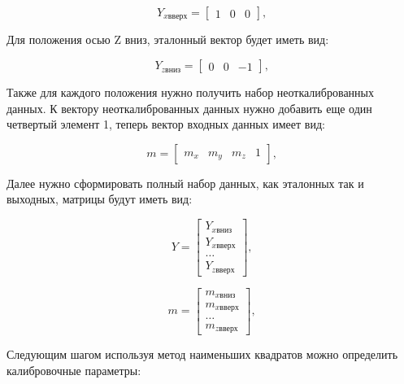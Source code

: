 \begin{equation}
    \label{eq:domain:Yxup}
    Y_{xвверх} = \begin{bmatrix}
            1 & 0 & 0
        \end{bmatrix}
        \text{,}
  \end{equation}

Для положения осью Z вниз, эталонный вектор будет иметь вид:

\begin{equation}
    \label{eq:domain:Yzdown}
    Y_{zвниз} = \begin{bmatrix}
            0 & 0 & -1
        \end{bmatrix}
        \text{,}
  \end{equation}

Также для каждого положения нужно получить набор неоткалиброванных данных. 
К вектору неоткалиброванных данных нужно добавить еще один четвертый элемент 1, теперь вектор входных данных имеет вид:

\begin{equation}
    \label{eq:domain:XL_meas}
    m = \begin{bmatrix}
            m_{x} & m_{y} & m_{z} & 1
        \end{bmatrix}
        \text{,}
  \end{equation}

Далее нужно сформировать полный набор данных, как эталонных так и выходных, матрицы будут иметь вид:

\begin{equation}
    \label{eq:domain:XL_Y_dataset}
    Y = \begin{bmatrix}
            Y_{xвниз} \\ Y_{xвверх} \\ \dots \\ Y_{zвверх}
        \end{bmatrix}
        \text{,}
  \end{equation}


\begin{equation}
    \label{eq:domain:XL_M_dataset}
    m = \begin{bmatrix}
            m_{xвниз} \\ m_{xвверх} \\ \dots \\ m_{zвверх}
        \end{bmatrix}
        \text{,}
  \end{equation}

Следующим шагом используя метод наименьших квадратов можно определить калибровочные параметры:

